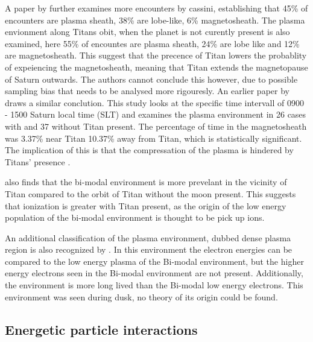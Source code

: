 \documentclass[12pt, parskip=full*, abstract]{scrartcl}
\begin{document}
A paper by \textcite{Smith-WithOrWithoutTitan} further examines more encounters by cassini, establishing that 45\% of encounters are plasma sheath, 38\% are lobe-like, 6\% magnetosheath. The plasma envionment along Titans obit, when the planet is not curently present is also examined, here 55\% of encountes are plasma sheath, 24\% are lobe like and 12\% are magnetosheath. This suggest that the precence of Titan lowers the probablity of expeiencing the magnetosheath, meaning that Titan extends the magnetopause of Saturn outwards. The authors cannot conclude this however, due to possible sampling bias that needs to be analysed more rigouresly. An earlier paper by \textcite{Wei-WithOrWithoutTitan} draws a similar conclution. This study looks at the specific time intervall of 0900 - 1500 Saturn local time (SLT) and examines the plasma environment in 26 cases with and 37 without Titan present. The percentage of time in the magnetosheath was 3.37\% near Titan 10.37\% away from Titan, which is statistically significant. The implication of this is that the compressation of the plasma is hindered by Titans' presence \parencite{Wei-WithOrWithoutTitan}.

\textcite{Smith-WithOrWithoutTitan} also finds that the bi-modal environment is more prevelant in the vicinity of Titan compared to the orbit of Titan without the moon present. This suggests that ionization is greater with Titan present, as the origin of the low energy population of the bi-modal environment is thought to be pick up ions. 

An additional classification of the plasma environment, dubbed dense plasma region is also recognized by \textcite{Smith-WithOrWithoutTitan}. In this environment the electron energies can be compared to the low energy plasma of the Bi-modal environment, but the higher energy electrons seen in the Bi-modal environment are not present. Additionally, the environment is more long lived than the Bi-modal low energy electrons. This environment was seen during dusk, no theory of its origin could be found.%



\subsection{Energetic particle interactions}

\end{document}

